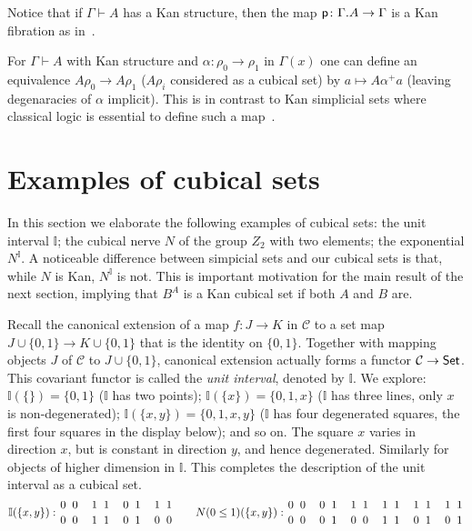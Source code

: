 \documentclass[10pt,a4paper]{article}
\newcommand{\CC}{{\mathcal C}}
\newcommand{\pp}{{\sf p}}
\newcommand{\set}[1]{\{#1\}}
\newcommand{\interval}{\mathbb{I}}
\begin{document}
Notice that if $\Gamma \vdash A$ has a Kan structure, then the map
$\pp \colon \Gamma.A \to \Gamma$ is a Kan fibration as in~\cite{Kan,
  Williamson}.

For $\Gamma \vdash A$ with Kan structure and $\alpha : \rho_0
\longrightarrow \rho_1$ in $\Gamma (x)$ one can define an equivalence
$A \rho_0 \to A \rho_1$ ($A\rho_i$ considered as a cubical set) by $a
\mapsto A \alpha^+ a$ (leaving degenaracies of $\alpha$ implicit).
This is in contrast to Kan simplicial sets where classical logic is
essential to define such a map~\cite{BC}.


\section{Examples of cubical sets}\label{sec:examples}
In this section we elaborate the following examples of cubical sets:
the unit interval $\interval$; the cubical nerve $N$ of the group
$Z_2$ with two elements; the exponential $N^\interval$.  A noticeable
difference between simpicial sets and our cubical sets is that, while
$N$ is Kan, $N^\interval$ is not.  This is important motivation for
the main result of the next section, implying that $B^A$ is a Kan
cubical set if both $A$ and $B$ are.

Recall the canonical extension of a map $f:J\to K$ in $\CC$ to a set
map $J \cup \set{0,1} \to K\cup \set{0,1}$ that is the identity on
$\set{0,1}$.  Together with mapping objects $J$ of $\CC$ to $J \cup
\set{0,1}$, canonical extension actually forms a functor $\CC\to{\sf
  Set}$.  This covariant functor is called the \emph{unit interval},
denoted by $\interval$.  We explore: $\interval(\set{})=\set{0,1}$
($\interval$ has two points); $\interval(\set{x})=\set{0,1,x}$
($\interval$ has three lines, only $x$ is non-degenerated);
$\interval(\set{x,y})=\set{0,1,x,y}$ ($\interval$ has four degenerated
squares, the first four squares in the display below); and so on.  The
square $x$ varies in direction $x$, but is constant in direction $y$,
and hence degenerated.  Similarly for objects of higher dimension in
$\interval$.  This completes the description of the unit interval as a
cubical set.
\[
\def\olll{{1 \atop 0} ~ {1 \atop 1}}
\def\oool{{0 \atop 0} ~ {1 \atop 0}}
\def\oooo{{0 \atop 0} ~ {0 \atop 0}}
\def\llll{{1 \atop 1} ~ {1 \atop 1}}
\def\olol{{1 \atop 0} ~ {1 \atop 0}}
\def\ooll{{0 \atop 0} ~ {1 \atop 1}}
\def\Fxy{{0 \atop 0} ~ {0 \atop 0}}
\def\Txy{{1 \atop 1} ~ {1 \atop 1}}
\def\Iy{{1 \atop 0} ~ {1 \atop 0}}
\def\Ix{{0 \atop 0} ~ {1 \atop 1}}
\interval(\set{x,y}):\Fxy\quad\Txy\quad\Ix\quad\Iy\quad\quad
N(0\leq1)(\set{x,y}):\oooo\quad\ooll\quad\olol\quad\llll\quad\olll\quad\olll\]
\end{document}
